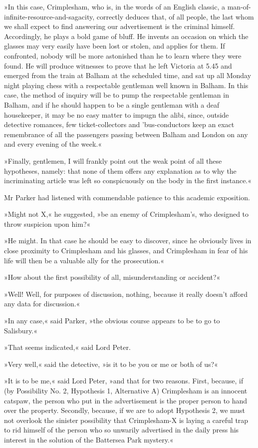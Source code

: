 »In this case, Crimplesham, who is, in the words of an English classic, a man-of-infinite-resource-and-sagacity, correctly deduces that, of all people, the last whom we shall expect to find answering our advertisement is the criminal himself. Accordingly, he plays a bold game of bluff. He invents an occasion on which the glasses may very easily have been lost or stolen, and applies for them. If confronted, nobody will be more astonished than he to learn where they were found. He will produce witnesses to prove that he left Victoria at 5.45 and emerged from the train at Balham at the scheduled time, and sat up all Monday night playing chess with a respectable gentleman well known in Balham. In this case, the method of inquiry will be to pump the respectable gentleman in Balham, and if he should happen to be a single gentleman with a deaf housekeeper, it may be no easy matter to impugn the alibi, since, outside detective romances, few ticket-collectors and 'bus-conductors keep an exact remembrance of all the passengers passing between Balham and London on any and every evening of the week.«

»Finally, gentlemen, I will frankly point out the weak point of all these hypotheses, namely: that none of them offers any explanation as to why the incriminating article was left so conspicuously on the body in the first instance.«

Mr Parker had listened with commendable patience to this academic exposition.

»Might not X,« he suggested, »be an enemy of Crimplesham's, who designed to throw suspicion upon him?«

»He might. In that case he should be easy to discover, since he obviously lives in close proximity to Crimplesham and his glasses, and Crimplesham in fear of his life will then be a valuable ally for the prosecution.«

»How about the first possibility of all, misunderstanding or accident?«

»Well! Well, for purposes of discussion, nothing, because it really doesn't afford any data for discussion.«

»In any case,« said Parker, »the obvious course appears to be to go to Salisbury.«

»That seems indicated,« said Lord Peter.

»Very well,« said the detective, »is it to be you or me or both of us?«

»It is to be me,« said Lord Peter, »and that for two reasons. First, because, if (by Possibility No. 2, Hypothesis 1, Alternative A) Crimplesham is an innocent catspaw, the person who put in the advertisement is the proper person to hand over the property. Secondly, because, if we are to adopt Hypothesis 2, we must not overlook the sinister possibility that Crimplesham-X is laying a careful trap to rid himself of the person who so unwarily advertised in the daily press his interest in the solution of the Battersea Park mystery.«

